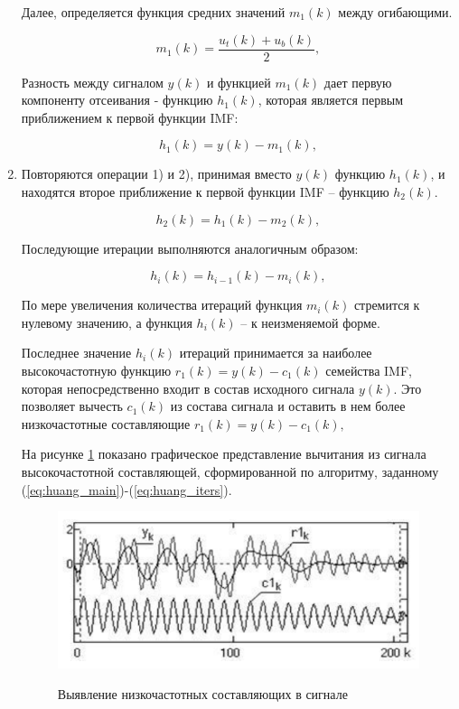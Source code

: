 \documentclass[utf8x, 14pt, oneside, a4paper]{article}
\begin{document}
\begin{enumerate}
		Далее, определяется функция средних значений $m_1(k)$ между огибающими.
		
		\begin{equation}
			m_1(k) = \frac{u_t(k)+u_b(k)}{2},
		\end{equation}
	
		\newpage
	
		Разность между сигналом $y(k)$ и функцией $m_1(k)$ дает первую компоненту отсеивания - функцию $h_1(k)$, которая является первым приближением к первой функции IMF:
		
		\begin{equation}
			h_1(k) = y(k)-m_1(k),
		\end{equation}
	
		\item Повторяются операции 1) и 2), принимая вместо $y(k)$ функцию $h_1(k)$, и находятся второе приближение к первой функции IMF – функцию $h_2(k)$.
		
		\begin{equation}
			h_2(k) = h_1(k)-m_2(k),
		\end{equation}
	
		Последующие итерации выполняются аналогичным образом:
		
		\begin{equation}\label{eq:huang_iters}
			h_i(k) = h_{i-1}(k)-m_i(k),
		\end{equation}
	
		По мере увеличения количества итераций функция $m_i(k)$ стремится к нулевому значению, а функция $h_i(k)$ – к неизменяемой форме.
		
		Последнее значение $h_i(k)$ итераций принимается за наиболее высокочастотную функцию $r_1(k) = y(k)-c_1(k)$ семейства IMF, которая непосредственно входит в состав исходного сигнала $y(k)$. Это позволяет вычесть $c_1(k)$ из состава сигнала и оставить в нем более низкочастотные составляющие $r_1(k) = y(k)-c_1(k),$
		
		На рисунке \ref{ris:huang_find_low_parts} показано графическое представление вычитания из сигнала высокочастотной составляющей, сформированной по алгоритму, заданному (\ref{eq:huang_main})-(\ref{eq:huang_iters}).
		
		\begin{figure}[h!]
			\begin{center}
				{\includegraphics[scale = 1.1]{img/huang_find_low_parts.png}}
			\end{center}
			\caption{Выявление низкочастотных составляющих в сигнале}
			\label{ris:huang_find_low_parts}
		\end{figure}
	

\end{enumerate}
\end{document}
